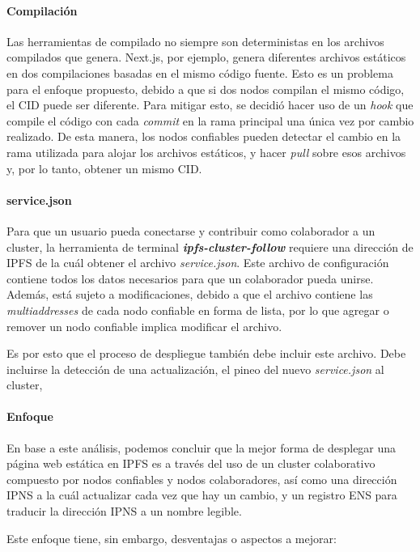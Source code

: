 \paragraph{Compilación} Las herramientas de compilado no siempre son deterministas en los archivos compilados que genera. Next.js, por ejemplo, genera diferentes archivos estáticos en dos compilaciones basadas en el mismo código fuente. Esto es un problema para el enfoque propuesto, debido a que si dos nodos compilan el mismo código, el CID puede ser diferente. Para mitigar esto, se decidió hacer uso de un \textit{hook} que compile el código con cada \textit{commit} en la rama principal una única vez por cambio realizado. De esta manera, los nodos confiables pueden detectar el cambio en la rama utilizada para alojar los archivos estáticos, y hacer \textit{pull} sobre esos archivos y, por lo tanto, obtener un mismo CID.

\paragraph{service.json} Para que un usuario pueda conectarse y contribuir como colaborador a un cluster, la herramienta de terminal \textit{\textbf{ipfs-cluster-follow}} requiere una dirección de IPFS de la cuál obtener el archivo \textit{service.json}. Este archivo de configuración contiene todos los datos necesarios para que un colaborador pueda unirse. Además, está sujeto a modificaciones, debido a que el archivo contiene las \textit{multiaddresses} de cada nodo confiable en forma de lista, por lo que agregar o remover un nodo confiable implica modificar el archivo.

Es por esto que el proceso de despliegue también debe incluir este archivo. Debe incluirse la detección de una actualización, el pineo del nuevo \textit{service.json} al cluster, 

\paragraph{Enfoque}

En base a este análisis, podemos concluir que la mejor forma de desplegar una página web estática en IPFS es a través del uso de un cluster colaborativo compuesto por nodos confiables y nodos colaboradores, así como una dirección IPNS a la cuál actualizar cada vez que hay un cambio, y un registro ENS para traducir la dirección IPNS a un nombre legible.

Este enfoque tiene, sin embargo, desventajas o aspectos a mejorar:

